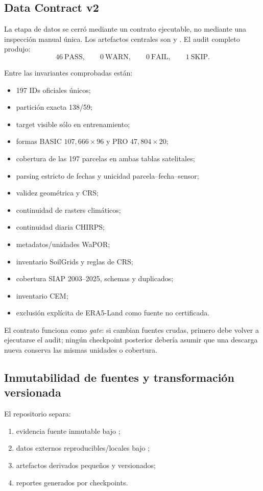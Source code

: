 \subsection{Data Contract v2}

La etapa de datos se cerró mediante un contrato ejecutable, no mediante una inspección manual
única. Los artefactos centrales son  y
. El audit completo produjo:
\[
46\ \text{PASS},\qquad
0\ \text{WARN},\qquad
0\ \text{FAIL},\qquad
1\ \text{SKIP}.
\]

Entre las invariantes comprobadas están:
\begin{itemize}
\item 197 IDs oficiales únicos;
\item partición exacta 138/59;
\item target visible sólo en entrenamiento;
\item formas BASIC $107{,}666\times96$ y PRO $47{,}804\times20$;
\item cobertura de las 197 parcelas en ambas tablas satelitales;
\item parsing estricto de fechas y unicidad parcela--fecha--sensor;
\item validez geométrica y CRS;
\item continuidad de rasters climáticos;
\item continuidad diaria CHIRPS;
\item metadatos/unidades WaPOR;
\item inventario SoilGrids y reglas de CRS;
\item cobertura SIAP 2003--2025, schemas y duplicados;
\item inventario CEM;
\item exclusión explícita de ERA5-Land como fuente no certificada.
\end{itemize}

El contrato funciona como \emph{gate}: si cambian fuentes crudas, primero debe volver a
ejecutarse el audit; ningún checkpoint posterior debería asumir que una descarga nueva conserva
las mismas unidades o cobertura.

\subsection{Inmutabilidad de fuentes y transformación versionada}

El repositorio separa:
\begin{enumerate}
\item evidencia fuente inmutable bajo ;
\item datos externos reproducibles/locales bajo ;
\item artefactos derivados pequeños y versionados;
\item reportes generados por checkpoints.
\end{enumerate}

